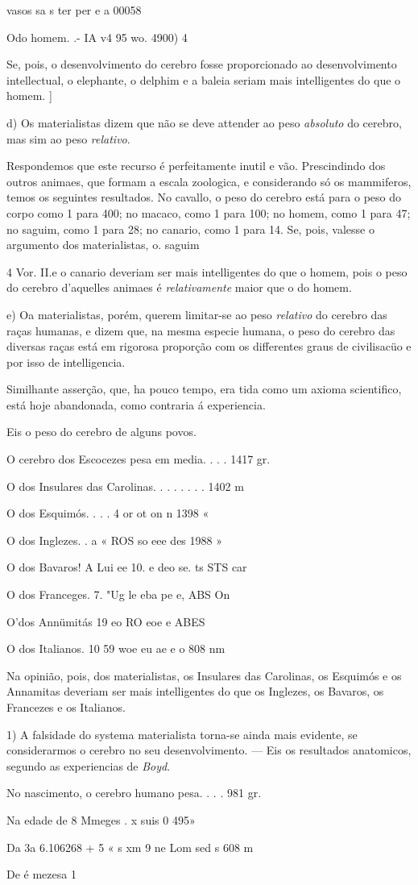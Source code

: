 vasos sa s ter per e a 00058\par Odo homem. .- IA v4 95 wo. 4900) 4\par Se, pois, o desenvolvimento do cerebro fosse proporcionado ao desenvolvimento intellectual, o elephante, o delphim e a baleia seriam mais intelligentes do que o homem. ]\par d) Os materialistas dizem que não se deve attender ao peso \emph{absoluto} do cerebro, mas sim ao peso \emph{relativo}.\par Respondemos que este recurso é perfeitamente inutil e vão. Prescindindo dos outros animaes, que formam a escala zoologica, e considerando só os mammiferos, temos os seguintes resultados. No cavallo, o peso do cerebro está para o peso do corpo como 1 para 400; no macaco, como 1 para 100; no homem, como 1 para 47; no saguim, como 1 para 28; no canario, como 1 para 14. Se, pois, valesse o argumento dos materialistas, o. saguim\par 4 Vor. II.e o canario deveriam ser mais intelligentes do que o homem, pois o peso do cerebro d'aquelles animaes é \emph{relativamente} maior que o do homem.\par e) Oa materialistas, porém, querem limitar-se ao peso \emph{relativo} do cerebro das raças humanas, e dizem que, na mesma especie humana, o peso do cerebro das diversas raças está em rigorosa proporção com os differentes graus de civilisacüo e por isso de intelligencia.\par Similhante asserção, que, ha pouco tempo, era tida como um axioma scientifico, está hoje abandonada, como contraria á experiencia.\par Eis o peso do cerebro de alguns povos.\par O cerebro dos Escocezes pesa em media. . . . 1417 gr.\par O dos Insulares das Carolinas. . . . . . . . 1402 m\par O dos Esquimós. . . . 4 or ot on n 1398 «\par O dos Inglezes. . a « ROS so eee des 1988 »\par O dos Bavaros! A Lui ee 10. e deo se. ts STS car\par O dos Franceges. 7. "Ug le eba pe e, ABS On\par O'dos Annümitás 19 eo RO eoe e ABES\par O dos Italianos. 10 59 woe eu ae e o 808 nm\par Na opinião, pois, dos materialistas, os Insulares das Carolinas, os Esquimós e os Annamitas deveriam ser mais intelligentes do que os Inglezes, os Bavaros, os Francezes e os Italianos.\par 1) A falsidade do systema materialista torna-se ainda mais evidente, se considerarmos o cerebro no seu desenvolvimento. --- Eis os resultados anatomicos, segundo as experiencias de \emph{Boyd}.\par No nascimento, o cerebro humano pesa. . . . 981 gr.\par Na edade de 8 Mmeges . x suis 0 495»\par Da 3a 6.106268 + 5 « s xm 9 ne Lom sed s 608 m\par De é mezesa 1 